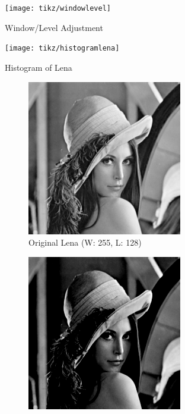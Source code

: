 \documentclass[12pt,english]{article}
\begin{document}
\begin{figure}
	\centering
	\texttt{[image: tikz/windowlevel]}
	\caption{Window/Level Adjustment}
	\label{fig:wlad}
\end{figure}

\begin{figure}
	\centering
	\texttt{[image: tikz/histogramlena]}
	\caption{Histogram of Lena}
	\label{fig:lenah}
\end{figure}

\begin{figure}
	 \centering
	 \begin{subfigure}[t]{0.4\textwidth}
	 	\centering
	 	\includegraphics[width=.9\textwidth]{img/lena}
	 	\caption{Original Lena (W: 255, L: 128)}
	 	\label{fig:lenao}
	 \end{subfigure}%
	 \qquad
	 \begin{subfigure}[t]{0.4\textwidth}
	 	\centering
	 	\includegraphics[width=.9\textwidth]{img/lenadark}

\end{subfigure}
\end{figure}
\end{document}
